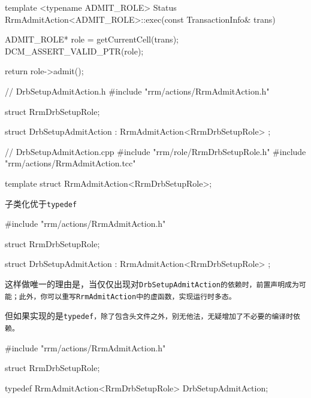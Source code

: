 \begin{content}
\begin{leftbar}
\begin{c++}
template <typename ADMIT_ROLE>
Status RrmAdmitAction<ADMIT_ROLE>::exec(const TransactionInfo& trans)
{
    ADMIT_ROLE* role = getCurrentCell(trans);
    DCM_ASSERT_VALID_PTR(role);

    return role->admit(); 
}
\end{c++}
\end{leftbar}

\begin{leftbar}
\begin{c++}
// DrbSetupAdmitAction.h 
#include "rrm/actions/RrmAdmitAction.h"

struct RrmDrbSetupRole;

struct DrbSetupAdmitAction : RrmAdmitAction<RrmDrbSetupRole> {};
\end{c++}
\end{leftbar}

\begin{leftbar}
\begin{c++}
// DrbSetupAdmitAction.cpp
#include "rrm/role/RrmDrbSetupRole.h"
#include "rrm/actions/RrmAdmitAction.tcc"

template struct RrmAdmitAction<RrmDrbSetupRole>;

\end{c++}
\end{leftbar}

\begin{regulation}
子类化优于\tt{typedef}
\end{regulation}

\begin{leftbar}
\begin{c++}
#include "rrm/actions/RrmAdmitAction.h"

struct RrmDrbSetupRole;

struct DrbSetupAdmitAction : RrmAdmitAction<RrmDrbSetupRole> {};
\end{c++}
\end{leftbar}

这样做唯一的理由是，当仅仅出现对\tt{DrbSetupAdmitAction}的依赖时，前置声明成为可能；此外，你可以重写\tt{RrmAdmitAction}中的虚函数，实现运行时多态。

但如果实现的是\tt{typedef}，除了包含头文件之外，别无他法，无疑增加了不必要的编译时依赖。

\begin{leftbar}
\begin{c++}
#include "rrm/actions/RrmAdmitAction.h"

struct RrmDrbSetupRole;

typedef RrmAdmitAction<RrmDrbSetupRole> DrbSetupAdmitAction;
\end{c++}
\end{leftbar}

\end{content}